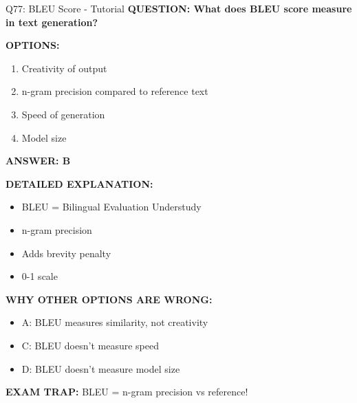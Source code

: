 \documentclass[8pt]{beamer}
\begin{document}
	\begin{frame}{Q77: BLEU Score - Tutorial}
		\fontsize{6.5}{7.5}\selectfont
		\textbf{QUESTION: What does BLEU score measure in text generation?}
		
		\vspace{0.1cm}
		\textbf{OPTIONS:}
		\begin{enumerate}
			\item Creativity of output
			\item n-gram precision compared to reference text
			\item Speed of generation
			\item Model size
		\end{enumerate}
		
		\vspace{0.1cm}
		\textcolor{myblue}{\textbf{ANSWER: B}}
		
		\vspace{0.1cm}
		\textbf{DETAILED EXPLANATION:}
		\begin{itemize}
			\item BLEU = Bilingual Evaluation Understudy
			\item n-gram precision
			\item Adds brevity penalty
			\item 0-1 scale
		\end{itemize}
		
		\vspace{0.1cm}
		\textcolor{myred}{\textbf{WHY OTHER OPTIONS ARE WRONG:}}
		\begin{itemize}
			\item \textcolor{myred}{A:} BLEU measures similarity, not creativity
			\item \textcolor{myred}{C:} BLEU doesn't measure speed
			\item \textcolor{myred}{D:} BLEU doesn't measure model size
		\end{itemize}
		
		\textcolor{myred}{\textbf{EXAM TRAP:}} BLEU = \textcolor{myblue}{n-gram precision} vs reference!
	\end{frame}
	
\end{document}
